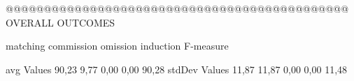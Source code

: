  @@@@@@@@@@@@@@@@@@@@@@@@@@@@@@@@@@@@@@@@@@@@@ OVERALL OUTCOMES

                matching commission   omission  induction   F-measure

avg Values       90,23       9,77       0,00       0,00       90,28        
stdDev Values    11,87        11,87       0,00       0,00       11,48        
